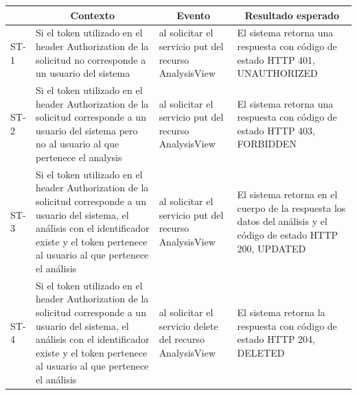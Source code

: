 \begin{longtable}{|p{1.0cm}|p{4cm}|p{4cm}|p{4cm}| }

	\hline
		\rowcolor[gray]{0.9} 
		\multicolumn{1}{|c}{Id test seguridad} & \multicolumn{1}{|c|}{Contexto} & \multicolumn{1}{|c|}{Evento} & \multicolumn{1}{|c|}{Resultado esperado} \\
	\hline
		ST-1 & Si el token utilizado en el header Authorization de la solicitud no corresponde a un usuario del sistema  & al solicitar el servicio put del recurso AnalysisView & El sistema retorna una respuesta con código de estado HTTP 401, UNAUTHORIZED\\
	\hline
		ST-2 & Si el token utilizado en el header Authorization de la solicitud corresponde a un usuario del sistema pero no al usuario al que pertenece el analysis & al solicitar el servicio put del recurso AnalysisView & El sistema retorna una respuesta con código de estado HTTP 403, FORBIDDEN\\
	\hline
		ST-3 & Si el token utilizado en el header Authorization de la solicitud corresponde a un usuario del sistema, el análisis con el identificador existe y el token pertenece al usuario al que pertenece el análisis & al solicitar el servicio put del recurso AnalysisView & El sistema retorna en el cuerpo de la respuesta los datos del análisis y el código de estado HTTP 200, UPDATED\\
	\hline
		ST-4 & Si el token utilizado en el header Authorization de la solicitud corresponde a un usuario del sistema, el análisis con el identificador existe y el token pertenece al usuario al que pertenece el análisis & al solicitar el servicio delete del recurso AnalysisView & El sistema retorna la respuesta con código de estado HTTP 204, DELETED\\
	\hline

\end{longtable}

